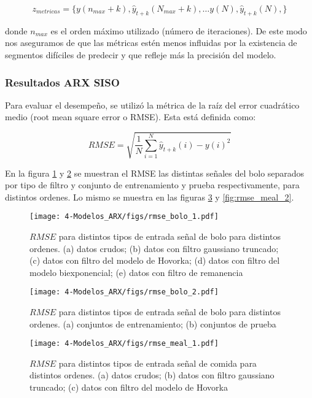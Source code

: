 \begin{equation}
	z_{metricas} = \{y(n_{max} + k), \hat{y}_{t+k}(N_{max} + k), \dots
	y(N), \hat{y}_{t+k}(N),
	\}
\end{equation}

donde $n_{max}$ es el orden máximo utilizado (número de iteraciones). De este modo nos aseguramos de que las métricas estén menos influidas por la existencia de segmentos difíciles de predecir y que refleje más la precisión del modelo.



\subsubsection*{Resultados ARX SISO}

Para evaluar el desempeño, se utilizó la métrica de la raíz del error cuadrático medio (root mean square error o RMSE). Esta está definida como:

\begin{equation}
	RMSE = \sqrt{\frac{1}{N} \sum_{i=1}^{N} \hat{y}_{t+k}(i) - y(i)^2}
\end{equation}

En la figura \ref{fig:rmse_bolo_1} y \ref{fig:rmse_bolo_2} se muestran el RMSE las distintas señales del bolo separados por tipo de filtro y conjunto de entrenamiento y prueba respectivamente, para distintos ordenes. Lo mismo se muestra en las figuras \ref{fig:rmse_meal_1} y \ref{fig:rmse_meal_2}.

\begin{figure}[H]
	\centering
	\texttt{[image: 4-Modelos\_ARX/figs/rmse\_bolo\_1.pdf]}
	\caption{$RMSE$ para distintos tipos de entrada señal de bolo para distintos ordenes. (a) datos crudos; (b) datos con filtro gaussiano truncado; (c) datos con filtro del modelo de Hovorka; (d) datos con filtro del modelo biexponencial; (e) datos con filtro de remanencia}
	\label{fig:rmse_bolo_1}
\end{figure}

\begin{figure}[H]
	\centering
	\texttt{[image: 4-Modelos\_ARX/figs/rmse\_bolo\_2.pdf]}
	\caption{$RMSE$ para distintos tipos de entrada señal de bolo para distintos ordenes. (a) conjuntos de entrenamiento; (b) conjuntos de prueba}
	\label{fig:rmse_bolo_2}
\end{figure}

\begin{figure}[H]
	\centering
	\texttt{[image: 4-Modelos\_ARX/figs/rmse\_meal\_1.pdf]}
	\caption{$RMSE$ para distintos tipos de entrada señal de comida para distintos ordenes. (a) datos crudos; (b) datos con filtro gaussiano truncado; (c) datos con filtro del modelo de Hovorka}
	\label{fig:rmse_meal_1}
\end{figure}

